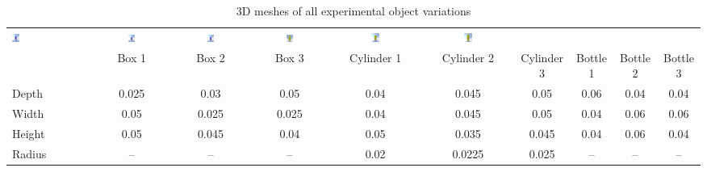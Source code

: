 \documentclass[11pt, a4paper]{report}
\begin{document}
\begin{table}[H]
{\begin{tabular}{lccccccccc}
            \includegraphics[width=0.1\textwidth]{docs/Project Report/Media/cylinder1.png} & \includegraphics[width=0.1\textwidth]{docs/Project Report/Media/cylinder2.png} & \includegraphics[width=0.1\textwidth]{docs/Project Report/Media/cylinder3.png} & \includegraphics[width=0.1\textwidth]{docs/Project Report/Media/mustard_bottle1.png} & \includegraphics[width=0.1\textwidth]{docs/Project Report/Media/mustard_bottle2.png} &  \includegraphics[width=0.1\textwidth]{docs/Project Report/Media/mustard_bottle3.png} \\
            & Box 1 & Box 2 & Box 3 & Cylinder 1 & Cylinder 2 & Cylinder 3 & Bottle 1 & Bottle 2 & Bottle 3 \\
            \midrule
            Depth  & 0.025 & 0.03  & 0.05  & 0.04 & 0.045  & 0.05  & 0.06 & 0.04 & 0.04 \\
            Width  & 0.05  & 0.025 & 0.025 & 0.04 & 0.045  & 0.05  & 0.04 & 0.06 & 0.06 \\
            Height & 0.05  & 0.045 & 0.04  & 0.05 & 0.035  & 0.045 & 0.04 & 0.06 & 0.04 \\
            Radius & --    & --    & --    & 0.02 & 0.0225 & 0.025 & --   & --   & --   \\
            \bottomrule
        \end{tabular}
    }
    \caption{3D meshes of all experimental object variations}
    \label{tbl:5.1}
\end{table}
\end{document}
